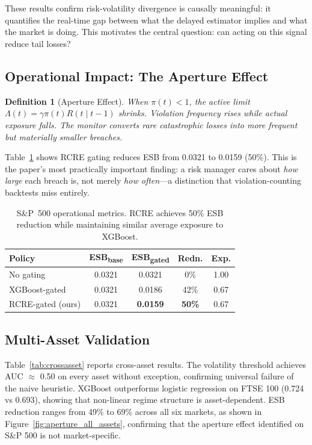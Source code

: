 \documentclass[sigconf]{acmart}
\newtheorem{definition}{Definition}
\begin{document}
These results confirm risk-volatility divergence is causally
meaningful: it quantifies the real-time gap between what the delayed
estimator implies and what the market is doing. This motivates the
central question: can acting on this signal reduce tail losses?

\subsection{Operational Impact: The Aperture Effect}
\label{sec:aperture}

\begin{definition}[Aperture Effect]
When $\pi(t){<}1$, the active limit
$\Lambda(t){=}\gamma\pi(t)\hat{R}(t\mid t{-}1)$ shrinks. Violation
frequency rises while actual exposure falls. The monitor converts rare
catastrophic losses into more frequent but materially smaller breaches.
\end{definition}

Table~\ref{tab:operational} shows RCRE gating reduces ESB from 0.0321 to 0.0159 (50\%). This is the paper's most practically important
finding: a risk manager cares about \emph{how large} each breach is,
not merely \emph{how often}---a distinction that violation-counting
backtests miss entirely.

\begin{table}[t]
\caption{S\&P~500 operational metrics. RCRE achieves 50\% ESB reduction while maintaining similar average exposure to XGBoost.}
\label{tab:operational}
\small
\begin{tabular}{lcccc}
\toprule
\textbf{Policy} & \textbf{ESB\textsubscript{base}} & \textbf{ESB\textsubscript{gated}} & \textbf{Redn.} & \textbf{Exp.} \\
\midrule
No gating         & 0.0321 & 0.0321 & 0\%  & 1.00 \\
XGBoost-gated     & 0.0321 & 0.0186 & 42\% & 0.67 \\
RCRE-gated (ours) & 0.0321 & \textbf{0.0159} & \textbf{50\%} & 0.67 \\
\bottomrule
\end{tabular}
\end{table}

\subsection{Multi-Asset Validation}

Table~\ref{tab:crossasset} reports cross-asset results. The volatility threshold achieves AUC $\approx$ 0.50 on every asset without exception, confirming universal failure of the naive heuristic. XGBoost outperforms logistic regression on FTSE 100 (0.724 vs 0.693), showing that non-linear regime structure is asset-dependent. ESB reduction ranges from 49\% to 69\% across all six markets, as shown in Figure~\ref{fig:aperture_all_assets}, confirming that the aperture effect identified on S\&P 500 is not market-specific.
\end{document}
